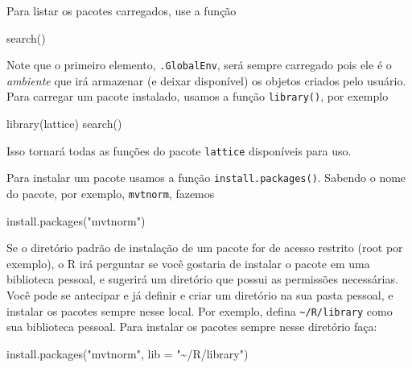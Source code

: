 \documentclass[
  10pt,
  a4paper]{book}
\newenvironment{Shaded}{\begin{snugshade}}{\end{snugshade}}
\newcommand{\AttributeTok}[1]{\textcolor[rgb]{0.77,0.63,0.00}{#1}}
\newcommand{\FunctionTok}[1]{\textcolor[rgb]{0.00,0.00,0.00}{#1}}
\newcommand{\NormalTok}[1]{#1}
\newcommand{\StringTok}[1]{\textcolor[rgb]{0.31,0.60,0.02}{#1}}
\begin{document}
Para listar os pacotes carregados, use a função

\begin{Shaded}
\begin{Highlighting}[]
\FunctionTok{search}\NormalTok{()}
\end{Highlighting}
\end{Shaded}

Note que o primeiro elemento, \texttt{.GlobalEnv}, será sempre carregado pois
ele é o \emph{ambiente} que irá armazenar (e deixar disponível) os objetos
criados pelo usuário. Para carregar um pacote instalado, usamos a função
\texttt{library()}, por exemplo

\begin{Shaded}
\begin{Highlighting}[]
\FunctionTok{library}\NormalTok{(lattice)}
\FunctionTok{search}\NormalTok{()}
\end{Highlighting}
\end{Shaded}

Isso tornará todas as funções do pacote \texttt{lattice} disponíveis para uso.

Para instalar um pacote usamos a função \texttt{install.packages()}. Sabendo o
nome do pacote, por exemplo, \texttt{mvtnorm}, fazemos

\begin{Shaded}
\begin{Highlighting}[]
\FunctionTok{install.packages}\NormalTok{(}\StringTok{"mvtnorm"}\NormalTok{)}
\end{Highlighting}
\end{Shaded}

Se o diretório padrão de instalação de um pacote for de acesso restrito
(root por exemplo), o R irá perguntar se você gostaria de instalar o
pacote em uma biblioteca pessoal, e sugerirá um diretório que possui as
permissões necessárias. Você pode se antecipar e já definir e criar um
diretório na sua pasta pessoal, e instalar os pacotes sempre nesse
local. Por exemplo, defina \texttt{\textasciitilde{}/R/library} como sua biblioteca pessoal.
Para instalar os pacotes sempre nesse diretório faça:

\begin{Shaded}
\begin{Highlighting}[]
\FunctionTok{install.packages}\NormalTok{(}\StringTok{"mvtnorm"}\NormalTok{, }\AttributeTok{lib =} \StringTok{"\textasciitilde{}/R/library"}\NormalTok{)}
\end{Highlighting}
\end{Shaded}
\end{document}
